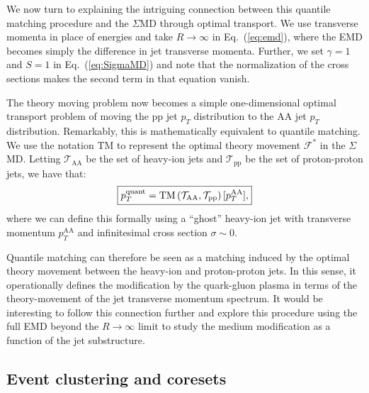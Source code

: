 \documentclass[letterpaper,11pt]{article}
\DeclareRobustCommand{\Eq}[1]{Eq.~(\ref{#1})}
\begin{document}
We now turn to explaining the intriguing connection between this quantile matching procedure and the $\Sigma$MD through optimal transport.
%
We use transverse momenta in place of energies and take $R\to\infty$ in \Eq{eq:emd}, where the EMD becomes simply the difference in jet transverse momenta.
%
Further, we set $\gamma = 1$ and $S=1$ in \Eq{eq:SigmaMD} and note that the normalization of the cross sections makes the second term in that equation vanish.


The theory moving problem now becomes a simple one-dimensional optimal transport problem of moving the pp jet $p_T$ distribution to the AA jet $p_T$ distribution.
%
Remarkably, this is mathematically equivalent to quantile matching.
%
We use the notation TM to represent the optimal theory movement $\mathcal F^*$ in the $\Sigma$MD.
%
Letting $\mathcal T_\text{AA}$ be the set of heavy-ion jets and $\mathcal T_\text{pp}$ be the set of proton-proton jets, we have that:
%
\begin{equation}
\begin{boxed}{
p_T^\text{quant} = \text{TM}\left(\mathcal T_\text{AA}, \mathcal T_\text{pp}\right)[p_{T}^\text{AA}],
}\end{boxed}
\end{equation}
%
where we can define this formally using a ``ghost'' heavy-ion jet with transverse momentum $p_T^\text{AA}$ and infinitesimal cross section $\sigma \sim 0$.


Quantile matching can therefore be seen as a matching induced by the optimal theory movement between the heavy-ion and proton-proton jets.
%
In this sense, it operationally defines the modification by the quark-gluon plasma in terms of the theory-movement of the jet transverse momentum spectrum.
%
It would be interesting to follow this connection further and explore this procedure using the full EMD beyond the $R\to\infty$ limit to study the medium modification as a function of the jet substructure.


\subsection{Event clustering and coresets}
\end{document}
